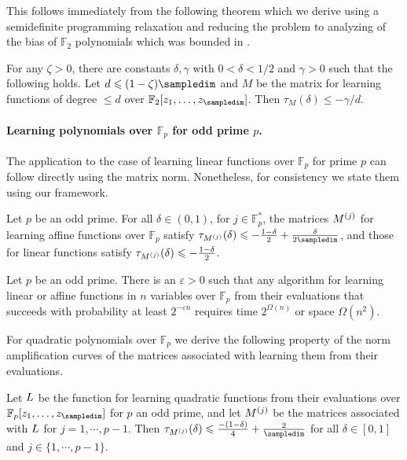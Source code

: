 This follows immediately from the following theorem which we derive using
a semidefinite programming relaxation and reducing the problem to
analyzing of the bias of $\mathbb{F}_2$ polynomials which was bounded in
\cite{DBLP:journals/cc/Ben-EliezerHL12}.

\begin{theorem}
\label{thm:F2curve}
For any $\zeta>0$, there are constants $\delta,\gamma$ with $0<\delta<1/2$ and
$\gamma>0$
such that the following holds.
Let $d\le (1-\zeta) \sampledim$ and $M$ be the matrix for learning functions of degree
$\le d$ over $\mathbb{F}_2[z_1,\ldots, z_\sampledim]$.  
Then $\tau_M(\delta)\le -\gamma/d$.
\end{theorem}

\paragraph{Learning polynomials over $\mathbb{F}_p$ for odd prime $p$.}

The application to the case of learning linear functions over
$\mathbb{F}_p$ for prime $p$ can follow directly using the matrix norm.
Nonetheless, for consistency we state them using our framework.

\begin{proposition}
\label{thm:linear-complex}
Let $p$ be an odd prime. 
For all $\delta\in (0,1)$,
for $j\in \mathbb{F}_p^*$, the matrices $M^{(j)}$ for
learning affine functions over $\mathbb{F}_p$ satisfy
$\tau_{\mj}(\delta)\le -\frac{1-\delta}2 +\frac{\delta}{2\sampledim}$, and those
for linear functions satisfy $\tau_{M^{(j)}}(\delta)\leqslant -\frac{1-\delta}2$.
\end{proposition}

\begin{corollary}
Let $p$ be an odd prime.  There is an $\varepsilon>0$ such that any
algorithm for learning linear or affine
functions in $n$ variables over $\mathbb{F}_p$ from their evaluations
that succeeds with probability at least $2^{-\varepsilon n}$ requires 
time $2^{\Omega(n)}$ or space $\Omega(n^2)$.
\end{corollary}

For quadratic polynomials over $\mathbb{F}_p$ we derive the
following property of the norm amplification curves of the matrices associated
with learning them from their evaluations.

\begin{sloppypar}
\begin{theorem}
\label{thm:quadcurve-complex}
Let $L$ be the function for learning  quadratic functions from their
evaluations over
$\mathbb{F}_p[z_1,\ldots, z_\sampledim]$ for $p$ an odd prime,
and let  $M^{(j)}$ be the matrices associated with $L$ for $j=1,\cdots,p-1$.
Then $\tau_{\mj}(\delta)\le \frac{-(1-\delta)}4+\frac 2 \sampledim$ for all 
$\delta\in [0,1]$ and $j\in \{1,\cdots,p-1\}$.
\end{theorem}
\end{sloppypar}


